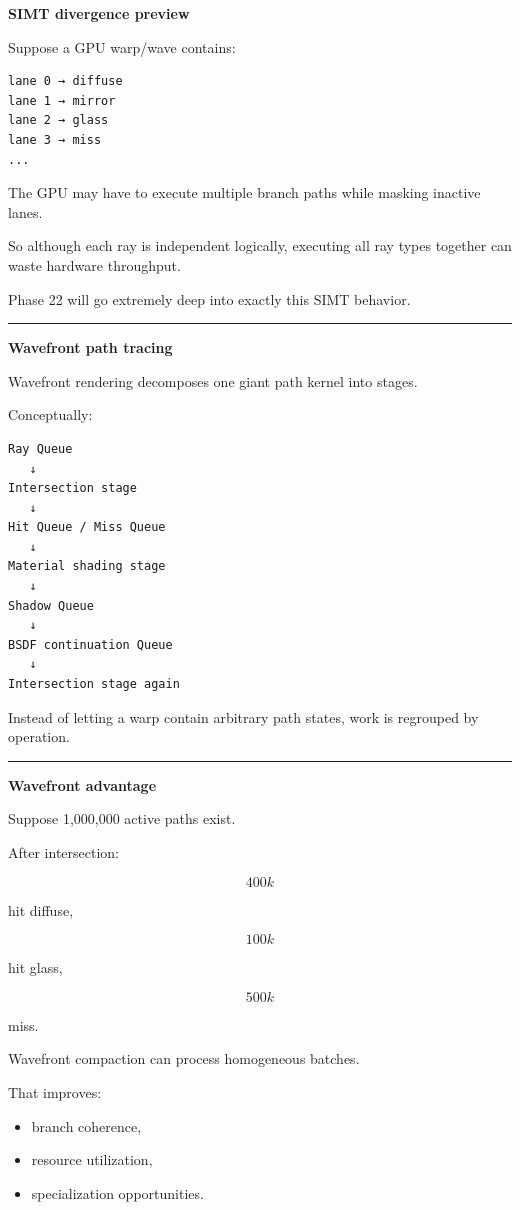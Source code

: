 \textbf{SIMT divergence preview}

Suppose a GPU warp/wave contains:

\begin{verbatim}
lane 0 → diffuse
lane 1 → mirror
lane 2 → glass
lane 3 → miss
...
\end{verbatim}

The GPU may have to execute multiple branch paths while masking inactive lanes.

So although each ray is independent logically, executing all ray types together can waste hardware throughput.

Phase 22 will go extremely deep into exactly this SIMT behavior.

\begin{center}\rule{0.5\linewidth}{0.5pt}\end{center}

\textbf{Wavefront path tracing}

Wavefront rendering decomposes one giant path kernel into stages.

Conceptually:

\begin{verbatim}
Ray Queue
   ↓
Intersection stage
   ↓
Hit Queue / Miss Queue
   ↓
Material shading stage
   ↓
Shadow Queue
   ↓
BSDF continuation Queue
   ↓
Intersection stage again
\end{verbatim}

Instead of letting a warp contain arbitrary path states, work is regrouped by operation.

\begin{center}\rule{0.5\linewidth}{0.5pt}\end{center}

\textbf{Wavefront advantage}

Suppose 1,000,000 active paths exist.

After intersection:

\[
400k
\]

hit diffuse,

\[
100k
\]

hit glass,

\[
500k
\]

miss.

Wavefront compaction can process homogeneous batches.

That improves:

\begin{itemize}
\tightlist
\item
  branch coherence,
\item
  resource utilization,
\item
  specialization opportunities.
\end{itemize}

